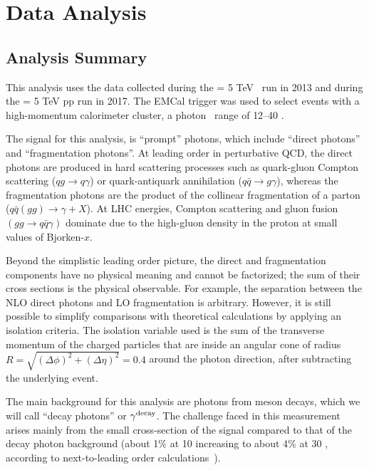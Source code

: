 % 







\chapter{Data Analysis}
\section{Analysis Summary}
This analysis uses the data collected during the \sqrtsNN{} = 5 TeV \pPb~run in 2013 and during the \sqrts{} = 5 TeV pp run in 2017. The EMCal trigger was used to select events with a high-momentum calorimeter cluster, a photon \pt~range of {12--40 \GeVc}.%

The signal for this analysis, is ``prompt'' photons, which include ``direct photons'' and ``fragmentation photons''. At leading order in perturbative QCD, the direct photons are produced in hard scattering processes such as quark-gluon Compton scattering ($qg\to q\gamma$) or quark-antiquark annihilation ($q\bar{q}\to g\gamma$), whereas the fragmentation photons are the product of the collinear fragmentation of a parton ($q\bar{q}(gg)\to \gamma + X$). At LHC energies, Compton scattering and gluon fusion $(gg\to  q\bar{q}\gamma)$ dominate due to the high-gluon density in the proton at small values of Bjorken-$x$. 

Beyond the simplistic leading order picture, the direct and fragmentation components have no physical meaning and cannot be factorized; the sum of their cross sections is the physical observable. For example, the separation between the NLO direct photons and LO fragmentation is arbitrary. However, it is still possible to simplify comparisons with theoretical calculations by applying an isolation criteria. The isolation variable used is the sum of the transverse momentum of the charged particles that are inside an angular cone of radius $R =\sqrt{(\Delta\phi)^{2} +(\Delta\eta)^{2}  } =0.4$ around the photon direction, after subtracting the underlying event. 

The main background for this analysis are photons from meson decays, which we will call ``decay photons'' or $\gamma^\mathrm{decay}$. The  challenge faced in this measurement arises mainly from the small cross-section of the signal compared to that of the decay photon background (about 1$\%$ at {10 \GeVc} increasing to about 4$\%$ at {30 \GeVc}, according to next-to-leading order calculations~\cite{Arleo:2004gn}). 

